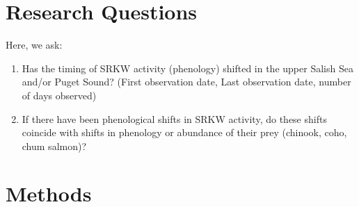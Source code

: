 \documentclass{article}
\begin{document}
\section* {Research Questions}
Here, we ask:
\begin{enumerate}
\item Has the timing of SRKW activity (phenology) shifted in the upper Salish Sea and/or Puget Sound? (First observation date, Last observation date, number of days observed)
\item If there have been phenological shifts in SRKW activity, do these shifts coincide with shifts in phenology or abundance of their prey (chinook, coho, chum salmon)?
\end{enumerate}


\section* {Methods}
\end{document}
